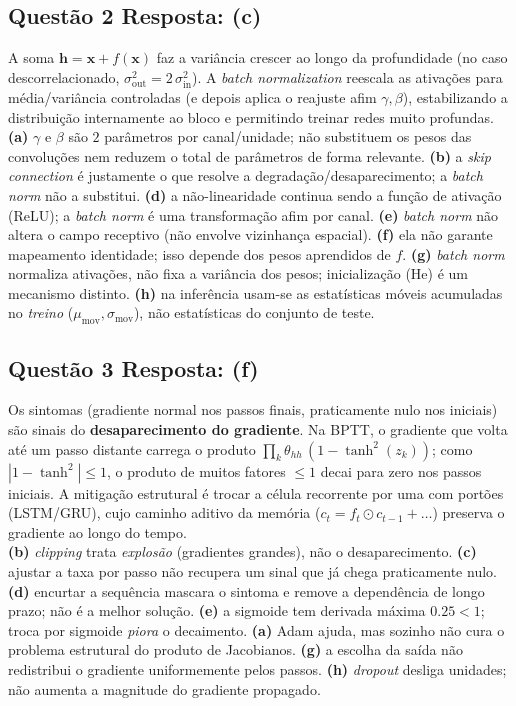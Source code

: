 \documentclass[11pt,a4paper]{article}
\begin{document}
\subsection*{Questão 2 \textemdash{} Resposta: (c)}
A soma $\mathbf{h} = \mathbf{x} + f(\mathbf{x})$ faz a variância crescer ao longo da profundidade (no caso descorrelacionado, $\sigma_{\text{out}}^2 = 2\,\sigma_{\text{in}}^2$). A \textit{batch normalization} reescala as ativações para média/variância controladas (e depois aplica o reajuste afim $\gamma, \beta$), estabilizando a distribuição internamente ao bloco e permitindo treinar redes muito profundas.\\
\textbf{(a)} $\gamma$ e $\beta$ são $2$ parâmetros por canal/unidade; não substituem os pesos das convoluções nem reduzem o total de parâmetros de forma relevante.
\textbf{(b)} a \textit{skip connection} é justamente o que resolve a degradação/desaparecimento; a \textit{batch norm} não a substitui.
\textbf{(d)} a não-linearidade continua sendo a função de ativação (ReLU); a \textit{batch norm} é uma transformação afim por canal.
\textbf{(e)} \textit{batch norm} não altera o campo receptivo (não envolve vizinhança espacial).
\textbf{(f)} ela não garante mapeamento identidade; isso depende dos pesos aprendidos de $f$.
\textbf{(g)} \textit{batch norm} normaliza ativações, não fixa a variância dos pesos; inicialização (He) é um mecanismo distinto.
\textbf{(h)} na inferência usam-se as estatísticas móveis acumuladas no \emph{treino} ($\mu_{\text{mov}}, \sigma_{\text{mov}}$), não estatísticas do conjunto de teste.

\subsection*{Questão 3 \textemdash{} Resposta: (f)}
Os sintomas (gradiente normal nos passos finais, praticamente nulo nos iniciais) são sinais do \textbf{desaparecimento do gradiente}. Na BPTT, o gradiente que volta até um passo distante carrega o produto $\prod_k \theta_{hh}\,(1 - \tanh^2(z_k))$; como $|1 - \tanh^2| \le 1$, o produto de muitos fatores $\le 1$ decai para zero nos passos iniciais. A mitigação estrutural é trocar a célula recorrente por uma com portões (LSTM/GRU), cujo caminho aditivo da memória ($c_t = f_t\odot c_{t-1} + \dots$) preserva o gradiente ao longo do tempo.\\
\textbf{(b)} \textit{clipping} trata \emph{explosão} (gradientes grandes), não o desaparecimento.
\textbf{(c)} ajustar a taxa por passo não recupera um sinal que já chega praticamente nulo.
\textbf{(d)} encurtar a sequência mascara o sintoma e remove a dependência de longo prazo; não é a melhor solução.
\textbf{(e)} a sigmoide tem derivada máxima $0.25 < 1$; troca por sigmoide \emph{piora} o decaimento.
\textbf{(a)} Adam ajuda, mas sozinho não cura o problema estrutural do produto de Jacobianos.
\textbf{(g)} a escolha da saída não redistribui o gradiente uniformemente pelos passos.
\textbf{(h)} \textit{dropout} desliga unidades; não aumenta a magnitude do gradiente propagado.
\end{document}
